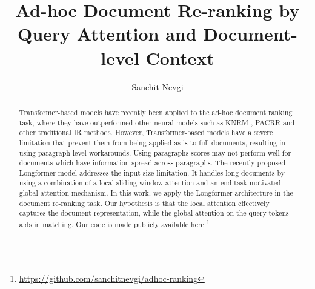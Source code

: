\documentclass[sigconf, nonacm=true]{acmart}
\begin{document}
\title{Ad-hoc Document Re-ranking by Query Attention and Document-level Context}

\author{Sanchit Nevgi}

\renewcommand{\shortauthors}{Nevgi et al.}


\begin{abstract}
  Transformer-based models have recently been applied to the ad-hoc document ranking task, where they have outperformed other neural models such as KNRM \cite{Xiong2017EndtoEndNA}, PACRR \cite{Yang2017AnseriniET} and other traditional IR methods. However, Transformer-based models have a severe limitation that prevent them from being applied as-is to full documents, resulting in using paragraph-level workarounds. Using paragraphs scores may not perform well for documents which have information spread across paragraphs. The recently proposed Longformer model \cite{Beltagy2020LongformerTL} addresses the input size limitation. It handles long documents by using a combination of a local sliding window attention and an end-task motivated global attention mechanism. In this work, we apply the Longformer architecture in the document re-ranking task. Our hypothesis is that the local attention effectively captures the document representation, while the global attention on the query tokens aids in matching. Our code is made publicly available here \footnote{\href{github.com/sanchitnevgi/adhoc-ranking}{https://github.com/sanchitnevgi/adhoc-ranking}}
\end{abstract}

\maketitle
\end{document}

